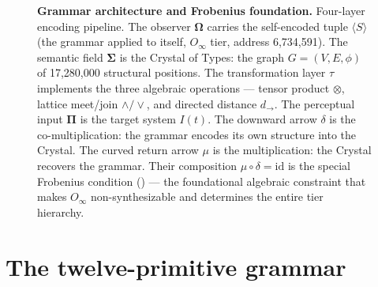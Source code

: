 \documentclass[12pt,a4paper]{article}
\begin{document}
\begin{figure}[H]
\centering
{}
\caption{\textbf{Grammar architecture and Frobenius foundation.}
Four-layer encoding pipeline. The observer $\boldsymbol{\Omega}$ carries
the self-encoded tuple $\langle S \rangle$ (the grammar applied to
itself, $O_\infty$ tier, address 6,734,591). The semantic field
$\boldsymbol{\Sigma}$ is the Crystal of Types: the graph $G=(V,E,\phi)$
of 17,280,000 structural positions. The transformation layer $\tau$
implements the three algebraic operations --- tensor product $\otimes$,
lattice meet/join $\wedge/\vee$, and directed distance $d_\to$. The
perceptual input $\boldsymbol{\Pi}$ is the target system $I(t)$. The
downward arrow $\delta$ is the co-multiplication: the grammar encodes
its own structure into the Crystal. The curved return arrow $\mu$ is
the multiplication: the Crystal recovers the grammar. Their composition
$\mu \circ \delta = \mathrm{id}$ is the special Frobenius condition
() --- the foundational algebraic constraint that
makes $O_\infty$ non-synthesizable and determines the entire tier
hierarchy.}
\label{fig:architecture}
\end{figure}

\section{The twelve-primitive grammar}
\label{sec:grammar}
\end{document}
